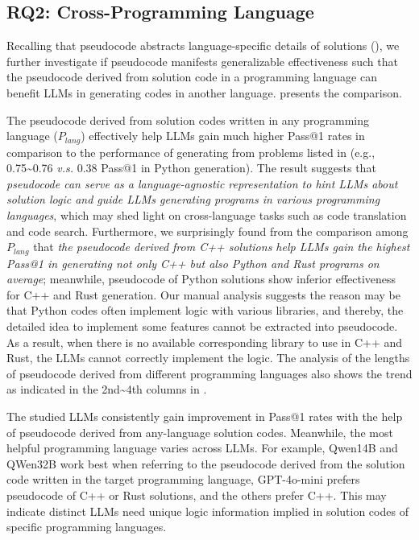 \subsection{RQ2: Cross-Programming Language}

Recalling that pseudocode abstracts language-specific details of solutions (), we further investigate if pseudocode manifests generalizable effectiveness such that the pseudocode derived from solution code in a programming language can benefit LLMs in generating codes in another language.
 presents the comparison. 

 The pseudocode derived from solution codes written in any programming language ($P_{lang}$) effectively help LLMs gain much higher Pass@1 rates in comparison to the performance of generating from problems listed in  (e.g., 0.75{\textasciitilde}0.76 \textit{v.s.} 0.38 Pass@1 in Python generation). The result suggests that \textit{pseudocode can serve as a language-agnostic representation to hint LLMs about solution logic and guide LLMs generating programs in various programming languages}, which may shed light on cross-language tasks such as code translation and code search. 
Furthermore, we surprisingly found from the comparison among $P_{lang}$ that \textit{the pseudocode derived from C++ solutions help LLMs gain the highest Pass@1 in generating not only C++ but also Python and Rust programs on average}; meanwhile, pseudocode of Python solutions show inferior effectiveness for C++ and Rust generation.
Our manual analysis suggests the reason may be that Python codes often implement logic with various libraries, and thereby, the detailed idea to implement some features cannot be extracted into pseudocode. As a result, when there is no available corresponding library to use in C++ and Rust, the LLMs cannot correctly implement the logic. The analysis of the lengths of pseudocode derived from different programming languages also shows the trend as indicated in the 2nd{\textasciitilde}4th columns in .%

 The studied LLMs consistently gain improvement in Pass@1 rates with the help of pseudocode derived from any-language solution codes. 
Meanwhile, the most helpful programming language varies across LLMs. For example, Qwen14B and QWen32B work best when referring to the pseudocode derived from the solution code written in the target programming language, GPT-4o-mini prefers pseudocode of C++ or Rust solutions, and the others prefer C++.
This may indicate distinct LLMs need unique logic information implied in solution codes of specific programming languages.







